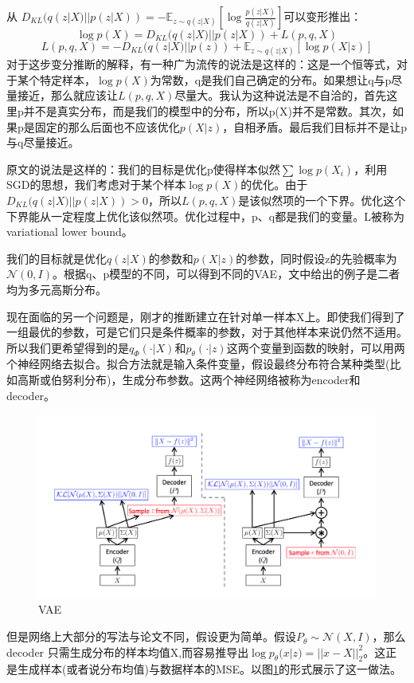 \documentclass[a4paper]{article}
\begin{document}
从
$D_{KL}(q(z|X)||p(z|X))=-\mathbb{E}_{z\sim q(z|X)}[\log\frac{p(z|X)}{q(z|X)}]$可以变形推出：
$$\log p(X)=D_{KL}(q(z|X)||p(z|X))+ L(p,q,X)$$
$$L(p,q,X)=-D_{KL}(q(z|X)||p(z))+\mathbb{E}_{z\sim q(z|X)}[\log p(X|z)]$$
对于这步变分推断的解释，有一种广为流传的说法是这样的：这是一个恒等式，对于某个特定样本，$\log p(X)$为常数，q是我们自己确定的分布。如果想让q与p尽量接近，那么就应该让$L(p,q,X)$尽量大。我认为这种说法是不自洽的，首先这里p并不是真实分布，而是我们的模型中的分布，所以p(X)并不是常数。其次，如果p是固定的那么后面也不应该优化$p(X|z)$，自相矛盾。最后我们目标并不是让p与q尽量接近。

原文的说法是这样的：我们的目标是优化p使得样本似然$\sum \log p(X_i)$，利用SGD的思想，我们考虑对于某个样本$\log p(X)$的优化。由于$D_{KL}(q(z|X)||p(z|X)) > 0$，所以$L(p,q,X)$是该似然项的一个下界。优化这个下界能从一定程度上优化该似然项。优化过程中，p、q都是我们的变量。L被称为variational lower bound。

我们的目标就是优化$q(z|X)$的参数和$p(X|z)$的参数，同时假设z的先验概率为$\mathcal{N}(0,I)$。根据q、p模型的不同，可以得到不同的VAE，文中给出的例子是二者均为多元高斯分布。

现在面临的另一个问题是，刚才的推断建立在针对单一样本X上。即使我们得到了一组最优的参数，可是它们只是条件概率的参数，对于其他样本来说仍然不适用。所以我们更希望得到的是$q_{\Phi}(\cdot|X)$和$p_{\theta}(\cdot|z)$这两个变量到函数的映射，可以用两个神经网络去拟合。拟合方法就是输入条件变量，假设最终分布符合某种类型(比如高斯或伯努利分布)，生成分布参数。这两个神经网络被称为encoder和decoder。
\begin{figure}
\includegraphics[width=\textwidth]{./img/2.png}
\caption{VAE}
\label{fig:vae}
\end{figure}

但是网络上大部分的写法与论文不同，假设更为简单。假设$P_\theta \sim \mathcal{N}(X,I)$，那么decoder
只需生成分布的样本均值X,而容易推导出$\log p_\theta(x|z) = ||x - X||_2^2$。这正是生成样本(或者说分布均值)与数据样本的MSE。\citep{vae_toturial}以图\ref{fig:vae}的形式展示了这一做法。
\end{document}

